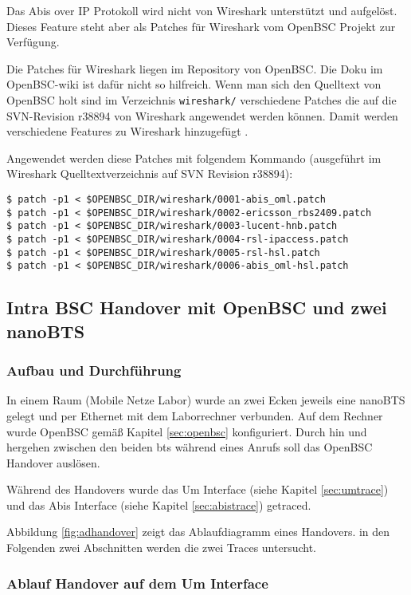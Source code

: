 Das Abis over IP Protokoll wird nicht von Wireshark unterstützt und aufgelöst. Dieses Feature steht aber als Patches für Wireshark vom OpenBSC Projekt zur Verfügung.

Die Patches für Wireshark liegen im Repository von OpenBSC. Die Doku im OpenBSC-wiki ist dafür nicht so hilfreich. Wenn man sich den Quelltext von OpenBSC holt sind im Verzeichnis \lstinline{wireshark/} verschiedene Patches die auf die SVN-Revision r38894 von Wireshark angewendet werden können. Damit werden verschiedene Features zu Wireshark hinzugefügt \cite{bib:wiresharkabis, bib:wiresharkabisreadme}.

Angewendet werden diese Patches mit folgendem Kommando (ausgeführt im Wireshark Quelltextverzeichnis auf SVN Revision r38894):
\begin{lstlisting}[caption={Patchen von Wireshark}]
$ patch -p1 < $OPENBSC_DIR/wireshark/0001-abis_oml.patch
$ patch -p1 < $OPENBSC_DIR/wireshark/0002-ericsson_rbs2409.patch
$ patch -p1 < $OPENBSC_DIR/wireshark/0003-lucent-hnb.patch
$ patch -p1 < $OPENBSC_DIR/wireshark/0004-rsl-ipaccess.patch
$ patch -p1 < $OPENBSC_DIR/wireshark/0005-rsl-hsl.patch
$ patch -p1 < $OPENBSC_DIR/wireshark/0006-abis_oml-hsl.patch 
\end{lstlisting}

\subsection{Intra BSC Handover mit OpenBSC und zwei nanoBTS}

\subsubsection{Aufbau und Durchführung}
In einem Raum (Mobile Netze Labor) wurde an zwei Ecken jeweils eine nanoBTS gelegt und per Ethernet mit dem Laborrechner verbunden. Auf dem Rechner wurde OpenBSC gemäß Kapitel \ref{sec:openbsc} konfiguriert. Durch hin und hergehen zwischen den beiden \gls{bts} während eines Anrufs soll das OpenBSC Handover auslösen.

Während des Handovers wurde das Um Interface (siehe Kapitel \ref{sec:umtrace}) und das Abis Interface (siehe Kapitel \ref{sec:abistrace}) getraced.

Abbildung \ref{fig:adhandover} zeigt das Ablaufdiagramm eines Handovers. in den Folgenden zwei Abschnitten werden die zwei Traces untersucht. 

\subsubsection{Ablauf Handover auf dem Um Interface}

